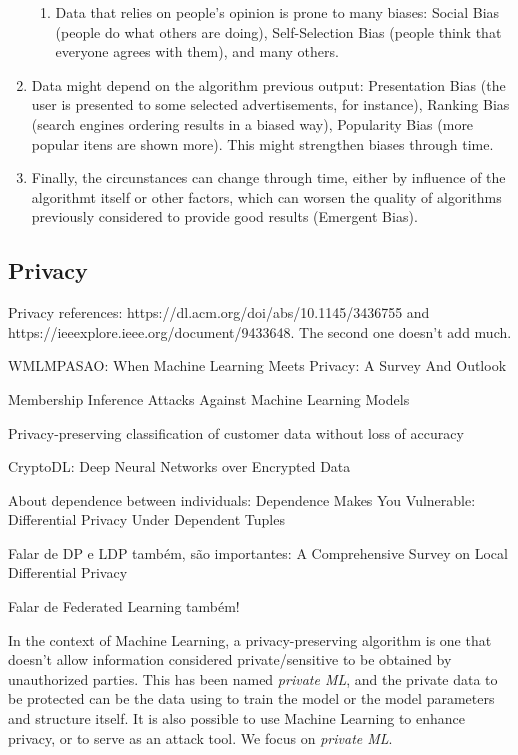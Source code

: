 \begin{enumerate}
\begin{enumerate}
    \item Data that relies on people's opinion is prone to many biases: Social Bias (people do what others are doing), Self-Selection Bias (people think that everyone agrees with them), and many others.
    \end{enumerate}
\item Data might depend on the algorithm previous output: Presentation Bias (the user is presented to some selected advertisements, for instance), Ranking Bias (search engines ordering results in a biased way), Popularity Bias (more popular itens are shown more). This might strengthen biases through time. 
\item Finally, the circunstances can change through time, either by influence of the algorithmt itself or other factors, which can worsen the quality of algorithms previously considered to provide good results (Emergent Bias).
\end{enumerate}


\subsection{Privacy}

{\color{red} Privacy references: https://dl.acm.org/doi/abs/10.1145/3436755 and https://ieeexplore.ieee.org/document/9433648. The second one doesn't add much.

 WMLMPASAO: When Machine Learning Meets Privacy: A Survey And Outlook


Membership Inference Attacks Against Machine Learning Models

Privacy-preserving classification of customer data without loss of accuracy

CryptoDL: Deep Neural Networks over Encrypted Data

About dependence between individuals: Dependence Makes You Vulnerable: Differential Privacy Under Dependent Tuples


}

{\color{red} Falar de DP e LDP também, são importantes: A Comprehensive Survey on Local Differential Privacy}

{\color{red} Falar de Federated Learning também!}

In the context of Machine Learning, a privacy-preserving algorithm is one that doesn't allow information considered private/sensitive to be obtained by unauthorized parties. This has been named \textit{private ML}\cite{WMLMPASAO}, and the private data to be protected can be the data using to train the model or the model parameters and structure itself. It is also possible to use Machine Learning to enhance privacy, or to serve as an attack tool. We focus on \textit{private ML}. 

